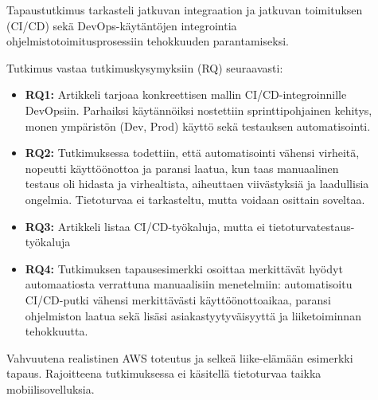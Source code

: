 \documentclass[bscthesis,finnish,oneside,biblatex]{uefcsthesis}
\begin{document}
\begin{description}
    \item[\cite{chatterjee2024_operational_efficiency}] Tapaustutkimus tarkasteli jatkuvan integraation ja jatkuvan toimituksen (CI/CD) sekä DevOps-käytäntöjen integrointia ohjelmistotoimitusprosessiin tehokkuuden parantamiseksi.

    Tutkimus vastaa tutkimuskysymyksiin (RQ) seuraavasti:
    \begin{itemize}
        \item \textbf{RQ1:} Artikkeli tarjoaa konkreettisen mallin CI/CD-integroinnille DevOpsiin. Parhaiksi käytännöiksi nostettiin sprinttipohjainen kehitys, monen ympäristön (Dev, Prod) käyttö sekä testauksen automatisointi.
        \item \textbf{RQ2:} Tutkimuksessa todettiin, että automatisointi vähensi virheitä, nopeutti käyttöönottoa ja paransi laatua, kun taas manuaalinen testaus oli hidasta ja virhealtista, aiheuttaen viivästyksiä ja laadullisia ongelmia. Tietoturvaa ei tarkasteltu, mutta voidaan osittain soveltaa.
        \item \textbf{RQ3:} Artikkeli listaa CI/CD-työkaluja, mutta ei tietoturvatestaus-työkaluja
        \item \textbf{RQ4:} Tutkimuksen tapausesimerkki osoittaa merkittävät hyödyt automaatiosta verrattuna manuaalisiin menetelmiin: automatisoitu CI/CD-putki vähensi merkittävästi käyttöönottoaikaa, paransi ohjelmiston laatua sekä lisäsi asiakastyytyväisyyttä ja liiketoiminnan tehokkuutta.
    \end{itemize}

    Vahvuutena realistinen AWS toteutus ja selkeä liike-elämään esimerkki tapaus.
    Rajoitteena tutkimuksessa ei käsitellä tietoturvaa taikka mobiilisovelluksia.
\end{description}
\end{document}
